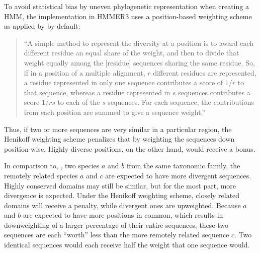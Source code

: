 \label{sec:hmmtest}
To avoid statistical bias by uneven phylogenetic representation when creating a
HMM, the implementation in HMMER3 \citep{eddy2009} uses a position-based
weighting scheme as applied by \citet{henikoff1994} by default: 

\begin{quote}
	``A simple method to represent the diversity at a position is to award each
	different residue an equal share of the weight, and then to divide that
	weight equally among the [residue] sequences sharing the same residue. So, if
	in a position of a multiple alignment, $r$ different residues are represented,
	a residue represented in only one sequence contributes a score of $1/r$ to
	that sequence, whereas a residue represented in $s$ sequences contributes a
	score $1/rs$ to each of the $s$ sequences. For each sequence, the
	contributions from each position are summed to give a sequence weight.''
	\hfill\citep{henikoff1994}
\end{quote} 

Thus, if two or more sequences are very similar in a particular region, the
Henikoff weighting scheme penalizes that by weighting the sequences down
position-wise. Highly diverse positions, on the other hand, would receive a
bonus. 

In comparison to, \eg, two species $a$ and $b$ from the same taxonomic family, the
remotely related species $a$ and $c$ are expected to have more divergent
sequences. Highly conserved domains may still be similar, but for the most part,
more divergence is expected. Under the Henikoff weighting scheme, closely
related domains will receive a penalty, while divergent ones are upweighted.
Because $a$ and $b$ are expected to have more positions in common, which results
in downweighting of a larger percentage of their entire sequences, these two
sequences are each ``worth'' less than the more remotely related sequence $c$.
Two identical sequences would each receive half the weight that one sequence
would.
